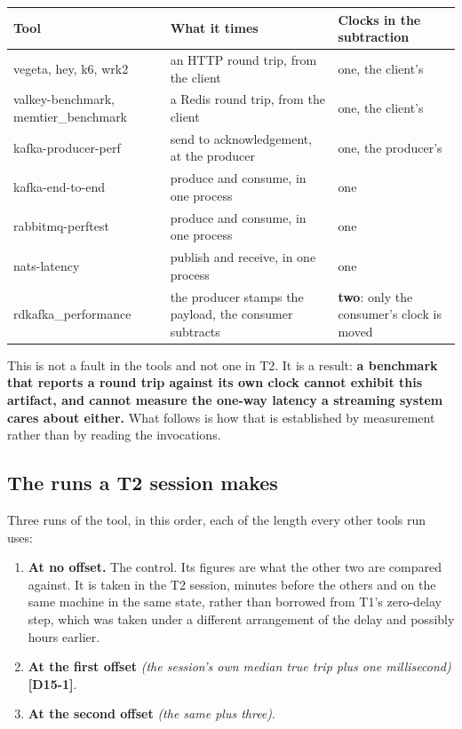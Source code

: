 \documentclass[11pt]{article}
\newcommand{\gl}[1]{{\color{soft}\itshape\small (#1)}}
\newcommand{\chgold}[1]{\,{\color{oldcol}\bfseries\footnotesize[#1]}}
\begin{document}
{\small
\begin{longtable}{@{}>{\raggedright\arraybackslash}p{4.2cm} >{\raggedright\arraybackslash}p{6.4cm} >{\raggedright\arraybackslash}p{4.8cm}@{}}
\toprule
\textbf{Tool} & \textbf{What it times} & \textbf{Clocks in the subtraction} \\
\midrule
\endhead
vegeta, hey, k6, wrk2 & an HTTP round trip, from the client & one, the client's \\
valkey-benchmark, memtier\_benchmark & a Redis round trip, from the client & one, the client's \\
kafka-producer-perf & send to acknowledgement, at the producer & one, the producer's \\
kafka-end-to-end & produce and consume, in one process & one \\
rabbitmq-perftest & produce and consume, in one process & one \\
nats-latency & publish and receive, in one process & one \\
rdkafka\_performance & the producer stamps the payload, the consumer subtracts & \textbf{two}: only the consumer's clock is moved \\
\bottomrule
\end{longtable}}

This is not a fault in the tools and not one in T2. It is a result: \textbf{a benchmark that
reports a round trip against its own clock cannot exhibit this artifact, and cannot measure the
one-way latency a streaming system cares about either.} What follows is how that is established
by measurement rather than by reading the invocations.

\subsection*{The runs a T2 session makes}
Three runs of the tool, in this order, each of the length every other tools run uses:

\begin{enumerate}
  \item \textbf{At no offset.} The control. Its figures are what the other two are compared
        against. It is taken in the T2 session, minutes before the others and on the same machine
        in the same state, rather than borrowed from T1's zero-delay step, which was taken under a
        different arrangement of the delay and possibly hours earlier.
  \item \textbf{At the first offset} \gl{the session's own median true trip plus one
        millisecond}\chgold{D15-1}.
  \item \textbf{At the second offset} \gl{the same plus three}.
\end{enumerate}
\end{document}
